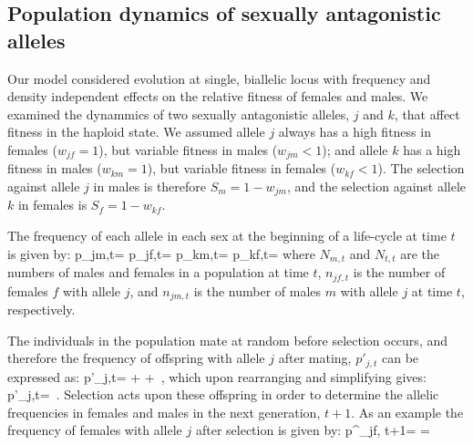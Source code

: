 \documentclass[12pt]{article}
\let\oldequation\equation
\let\oldendequation\endequation
\renewenvironment{equation}
  {\linenomathNonumbers\oldequation}
  {\oldendequation\endlinenomath}
\begin{document}
\subsection*{Population dynamics of sexually antagonistic alleles}

 Our model considered evolution at single, biallelic  locus with frequency and density independent effects on the relative fitness of females and males. We examined the dynammics of two  sexually antagonistic alleles, $j$ and $k$, that affect fitness in the haploid state. We assumed allele $j$ always has a high fitness in females ($w_{jf} = 1$), but variable fitness in males ($w_{jm} < 1$); and allele $k$ has a high fitness in males ($w_{km} = 1$), but variable fitness in females ($w_{kf} < 1 $). The selection against allele $j$ in males is therefore $S_{m}= 1 - w_{jm}$, and the selection against allele $k$ in females is $S_{f}= 1 - w_{kf}$.

 The frequency of each allele in each sex at the beginning of a life-cycle at time $t$ is given by:
 \begin{equation}
     p_{jm,t}= 
     \label{first_pop}
 \end{equation}
 \begin{equation}
     p_{jf,t}= 
 \end{equation}
 \begin{equation}
     p_{km,t}= 
 \end{equation}
 \begin{equation}
     p_{kf,t}= 
 \end{equation}
 where $N_{m,t}$ and $N_{t,t}$ are the numbers of males and females in a population at time $t$, $n_{jf,t}$ is the number of females $f$ with allele $j$, and $n_{jm,t}$ is the number of males $m$ with allele $j$ at time $t$, respectively.

 The individuals in the population mate at random before selection occurs, and therefore the frequency of offspring with allele $j$ after mating, $p'_{j,t}$ can be expressed as:
 \begin{equation}
    p'_{j,t}=   +    +
      \,,
 \end{equation}
which upon rearranging and simplifying gives:
 \begin{equation}
    p'_{j,t}=  \,.
    \label{pprime}
 \end{equation}
 Selection acts upon these offspring in order to determine the allelic frequencies in females and males in the next generation, $t+1$. As an example the frequency  of females with allele $j$ after selection is given by:
 \begin{equation}
    p^{\prime}_{jf, t+1}=  = 
    \label{next_gen}
 \end{equation}
\end{document}
